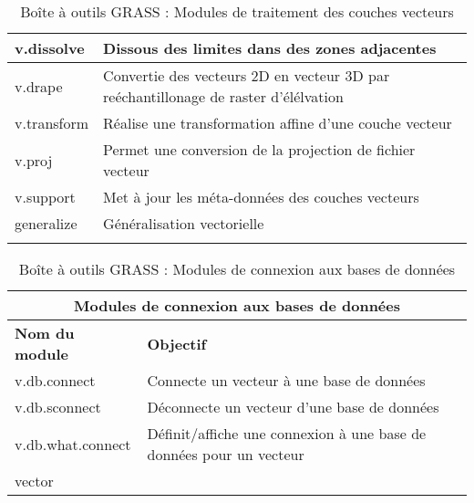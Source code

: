 \begin{center}
{\begin{longtable}{|p{2.5cm}|p{11.5cm}|}
  \hline v.dissolve & Dissous des limites dans des zones adjacentes\\
  \hline v.drape & Convertie des vecteurs 2D en vecteur 3D par reéchantillonage de raster d'élélvation\\
  \hline v.transform & Réalise une transformation affine d'une couche vecteur\\
  \hline v.proj & Permet une conversion de la projection de fichier vecteur\\
  \hline v.support & Met à jour les méta-données des couches vecteurs\\
  \hline generalize & Généralisation vectorielle\\ 
\hline
\caption{Boîte à outils GRASS : Modules de traitement des couches vecteurs}
\end{longtable}}
\end{center} 


\begin{table}[H]
\centering
 \begin{tabular}{|p{4cm}|p{10cm}|}
  \hline \multicolumn{2}{|c|}{\textbf{Modules de connexion aux bases de données}} \\
  \hline \textbf{Nom du module} & \textbf{Objectif} \\
  \hline v.db.connect & Connecte un vecteur à une base de données\\
  \hline v.db.sconnect & Déconnecte un vecteur d'une base de données\\
  \hline v.db.what.connect & Définit/affiche une connexion à une base de données pour un vecteur\\ vector \\
\hline
\end{tabular}
\caption{Boîte à outils GRASS : Modules de connexion aux bases de données}
\end{table}


